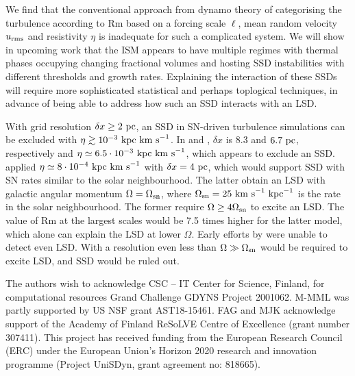 \documentclass[preprint2]{aastex63}
\newcommand\OSN{\Omega_{\rm sn}}
\newcommand\kpc{~ {\rm kpc}}
\newcommand\pc{~ {\rm pc}}
\newcommand\dx{ {\delta x}}
\newcommand\kms{~ {\rm km~ s}^{-1}}
\begin{document}
 We find that the conventional approach from dynamo theory of categorising the 
 turbulence according to Rm based on a forcing scale $\ell$, mean random velocity
 $u_{\rm rms}$ and resistivity $\eta$ is inadequate for such a complicated
 system.
 We will show in upcoming work that the ISM appears to have multiple regimes
 with thermal phases occupying changing fractional volumes
 \citep[e.g.][]{gatto2015} and hosting SSD instabilities with different
 thresholds and growth rates.
 Explaining the interaction of these SSDs will require more sophisticated
 statistical and perhaps toplogical techniques, in advance of being able to 
 address how such an SSD interacts with an LSD.

 With grid resolution $\dx\geq2\pc$, an SSD in SN-driven turbulence simulations
 can be excluded with $\eta\gtrsim10^{-3}\kpc\kms$.
 In \citet{Gressel:2008} and \citet{GE20}, $\dx$ is 8.3 and $6.7\pc$,
 respectively and $\eta\simeq6.5\cdot10^{-3}\kpc\kms$, which appears to exclude
 an SSD.
 \citet{Gent:2013b} applied $\eta\simeq8\cdot10^{-4}\kpc\kms$ with $\dx=4\pc$,
 which would support SSD with SN rates similar to the solar neighbourhood.
 The latter obtain an LSD with galactic angular momentum $\Omega=\OSN$, where
 $\OSN=25\kms\kpc^{-1}$ is the rate in the solar neighbourhood.
 The former require $\Omega\geq4\OSN$ to excite an LSD.
 The value of Rm at the largest scales would be 7.5 times higher for the latter
 model, which alone can explain the LSD at lower $\Omega$.
 Early efforts by \citet{Korpi:1999b} were unable to detect even LSD.
 With a resolution even less than \citet{Gressel:2008} $\Omega\gg\OSN$ would
 be required to excite LSD, and SSD would be ruled out.

\acknowledgments
The authors wish to acknowledge CSC – IT Center for Science, Finland, for
computational resources Grand Challenge GDYNS Project 2001062.
M-MML was partly supported by US NSF grant AST18-15461.
FAG and MJK acknowledge support of the Academy of Finland
ReSoLVE Centre of Excellence (grant number 307411).
This project has received funding from the European Research Council (ERC)
under the European Union's Horizon 2020 research and innovation
programme (Project UniSDyn, grant agreement no: 818665).

{}

\end{document}
